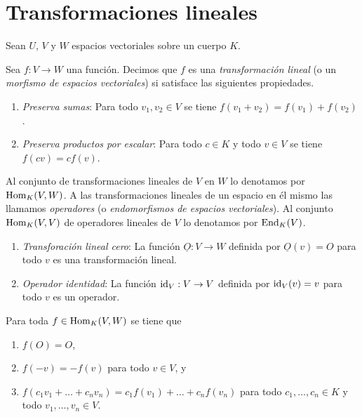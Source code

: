 \section{Transformaciones lineales}

Sean $U$, $V$ y $W$ espacios vectoriales sobre un cuerpo $K$.

\begin{defn}\label{deftrli}
Sea $f:V\rightarrow W$ una funci\'on. Decimos que $f$ es una \emph{transformaci\'on lineal} (o un \emph{morfismo de espacios vectoriales}) si satisface las siguientes propiedades.
\begin{enumerate}
\item \emph{Preserva sumas}: Para todo $v_1,v_2\in V$ se tiene $f(v_1+v_2)=f(v_1)+f(v_2)$.
\item \emph{Preserva productos por escalar}: Para todo $c\in K$ y todo $v\in V$ se tiene $f(cv)=cf(v)$. 
\end{enumerate}
Al conjunto de transformaciones lineales de $V$ en $W$ lo denotamos por $\operatorname{Hom}_K(V,W)$. A las transformaciones lineales de un espacio en \'el mismo las llamamos \emph{operadores} (o \emph{endomorfismos de espacios vectoriales}). Al conjunto $\operatorname{Hom}_K(V,V)$ de operadores lineales de $V$ lo denotamos por $\operatorname{End}_K(V)$.
\end{defn}

\begin{ejem}
\begin{enumerate}
\item \emph{Transforaci\'on lineal cero}: La funci\'on $\underline{O}:V\rightarrow W$ definida por $\underline{O}(v)=O$ para todo $v$ es una transformaci\'on lineal.
\item \emph{Operador identidad}: La funci\'on $\operatorname{id}_V:V\rightarrow V$ definida por $\operatorname{id}_V(v)=v$ para todo $v$ es un operador.
\end{enumerate}  
\end{ejem}

\begin{pro}\label{proptrlinbasicas}
Para toda $f\in\operatorname{Hom}_K(V,W)$ se tiene que
\begin{enumerate}
\item $f(O)=O$,
\item $f(-v)=-f(v)$ para todo $v\in V$, y
\item $f(c_1v_1+\ldots+c_nv_n)=c_1f(v_1)+\ldots+c_nf(v_n)$ para todo $c_1,\ldots,c_n\in K$ y todo $v_1,\ldots,v_n\in V$.
\end{enumerate}
\end{pro}

